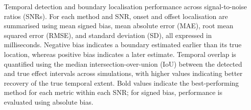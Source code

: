 \documentclass[
  doc,
  floatsintext,
  longtable,
  a4paper,
  nolmodern,
  notxfonts,
  notimes,
  colorlinks=true,linkcolor=blue,citecolor=blue,urlcolor=blue]{apa7}
\begin{document}
\begin{table}

{\caption{{Temporal detection and boundary localisation performance
across signal-to-noise ratios (SNRs). For each method and SNR, onset and
offset localisation are summarised using mean signed bias, mean absolute
error (MAE), root mean squared error (RMSE), and standard deviation
(SD), all expressed in milliseconds. Negative bias indicates a boundary
estimated earlier than its true location, whereas positive bias
indicates a later estimate. Temporal overlap is quantified using the
median intersection-over-union (IoU) between the detected and true
effect intervals across simulations, with higher values indicating
better recovery of the true temporal extent. Bold values indicate the
best-performing method for each metric within each SNR; for signed bias,
performance is evaluated using absolute
bias.}{\label{tbl-simulation-results}}}}


\end{table}
\end{document}
